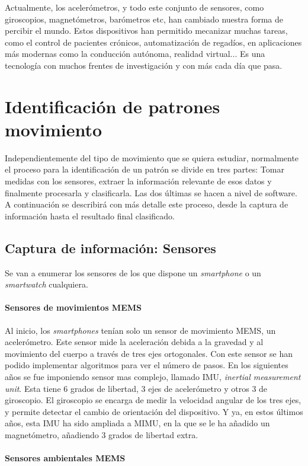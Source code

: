 \documentclass[12pt]{book}
\numberwithin{equation}{section}
\begin{document}
Actualmente, los acelerómetros, y todo este conjunto de sensores, como giroscopios, magnetómetros, barómetros etc, han cambiado nuestra forma de percibir el mundo. Estos dispositivos han permitido mecanizar muchas tareas, como el control de pacientes crónicos, automatización de regadíos, en aplicaciones más modernas como la conducción autónoma, realidad virtual... Es una tecnología con muchos frentes de investigación y con más cada día que pasa.

\section{Identificación de patrones movimiento}
Independientemente del tipo de movimiento que se quiera estudiar, normalmente el proceso para la identificación de un patrón se divide en tres partes: Tomar medidas con los sensores, extraer la información relevante de esos datos y finalmente procesarla y clasificarla. Las dos últimas se hacen a nivel de software. A continuación se describirá con más detalle este proceso, desde la captura de información hasta el resultado final clasificado.

\subsection{Captura de información: Sensores}
Se van a enumerar los sensores de los que dispone un \textit{smartphone} o un \textit{smartwatch} cualquiera.

\paragraph{Sensores de movimientos MEMS}

Al inicio, los \textit{smartphones} tenían solo un sensor de movimiento MEMS, un acelerómetro. Este sensor mide la aceleración debida a la gravedad y al movimiento del cuerpo a través de tres ejes ortogonales. Con este sensor se han podido implementar algoritmos para ver el número de pasos. En los siguientes años se fue imponiendo sensor mas complejo, llamado IMU, \textit{inertial measurement unit}. Esta tiene 6 grados de libertad, 3 ejes de acelerómetro y otros 3 de giroscopio. El giroscopio se encarga de medir la velocidad angular de los tres ejes, y permite detectar el cambio de orientación del dispositivo. Y ya, en estos últimos años, esta IMU ha sido ampliada a MIMU, en la que se le ha añadido un magnetómetro, añadiendo 3 grados de libertad extra.

\paragraph{Sensores ambientales MEMS}
\end{document}
